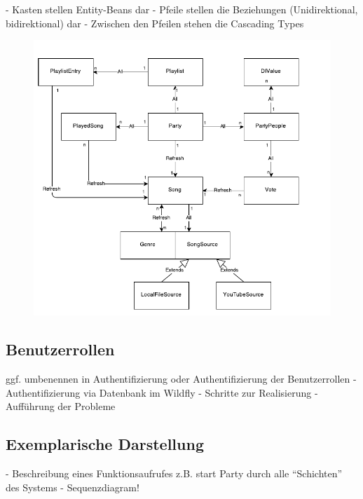 
- Kasten stellen Entity-Beans dar
- Pfeile stellen die Beziehungen (Unidirektional, bidirektional) dar
- Zwischen den Pfeilen stehen die Cascading Types

\begin{figure}[H]
\centering
\includegraphics[width=1\linewidth]{Bilder/EntityBeansModelMitCascading}
\caption{}
\label{fig:EntityBeansModelMitCascading}
\end{figure}


\subsection{Benutzerrollen}

ggf. umbenennen in Authentifizierung oder Authentifizierung der Benutzerrollen
- Authentifizierung via Datenbank im Wildfly
- Schritte zur Realisierung
- Aufführung der Probleme


\subsection{Exemplarische Darstellung}
- Beschreibung eines Funktionsaufrufes z.B. start Party durch alle "`Schichten"' des Systems
- Sequenzdiagram!



